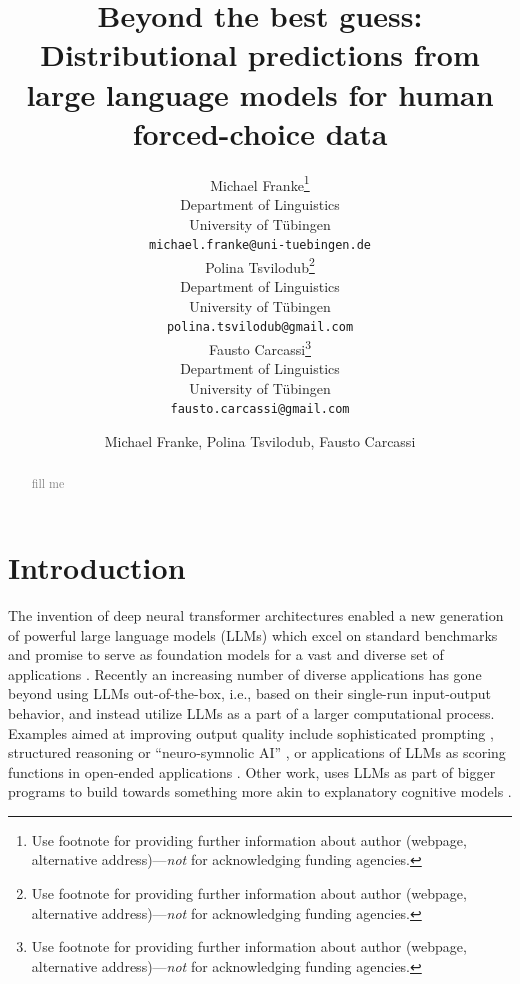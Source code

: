 \documentclass[fleqn]{article}
\title{Beyond the best guess: Distributional predictions from large language models for human forced-choice data}
\date{}
\author{ Michael Franke\thanks{Use footnote for providing further
		information about author (webpage, alternative
		address)---\emph{not} for acknowledging funding agencies.} \\
	Department of Linguistics\\
	University of Tübingen\\
	\texttt{michael.franke@uni-tuebingen.de} \\
	\And
	Polina Tsvilodub\thanks{Use footnote for providing further
		information about author (webpage, alternative
		address)---\emph{not} for acknowledging funding agencies.} \\
	Department of Linguistics\\
	University of Tübingen\\
	\texttt{polina.tsvilodub@gmail.com} \\
	\And
	Fausto Carcassi\thanks{Use footnote for providing further
		information about author (webpage, alternative
		address)---\emph{not} for acknowledging funding agencies.} \\
	Department of Linguistics\\
	University of Tübingen\\
	\texttt{fausto.carcassi@gmail.com} \\
}
\author{Michael Franke, Polina Tsvilodub, Fausto Carcassi}
\affil{Department of Linguistics\\University of Tübingen\\
\texttt{[michael.franke|polina.tsvilodub|fausto.carcassi]@uni-tuebingen.de}}
\begin{document}
\maketitle

\begin{abstract}
	{\textcolor{gray}{fill me}}
\end{abstract}



\section{Introduction}
\label{sec:introduction}

The invention of deep neural transformer architectures \citep{VaswaniShazeer2017:Attention-is-Al} enabled a new generation of powerful large language models (LLMs) \citep{DevlinChang2019:BERT:-Pre-train,ChungHou2022:Scaling-Instruc,OpenAI2023:GPT-4-Technical,TouvronLavril2023:LLaMA:-Open-and} which excel on standard benchmarks and promise to serve as foundation models for a vast and diverse set of applications \citep{BommasaniHudson2021:On-the-opportun}.
Recently an increasing number of diverse applications has gone beyond using LLMs out-of-the-box, i.e., based on their single-run input-output behavior, and instead utilize LLMs as a part of a larger computational process.
Examples aimed at improving output quality include sophisticated prompting \citep{LiuLiu2022:Generated-Knowl}, structured reasoning or ``neuro-symnolic AI'' \citep{CreswellShanahan2022:Selection-Infer}, or applications of LLMs as scoring functions in open-ended applications \citep{ZhangLehman2023:OMNI:-Open-ende}.
Other work, uses LLMs as part of bigger programs to build towards something more akin to explanatory cognitive models \citep{WongGrand2023:From-Word-Model}.
\end{document}
